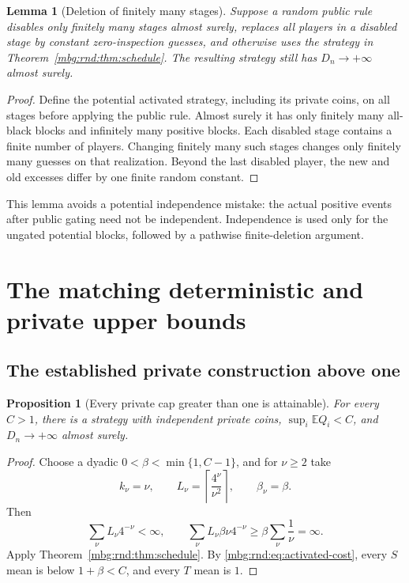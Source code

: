 \documentclass[11pt,letterpaper]{article}
\newtheorem{lemma}[theorem]{Lemma}
\newtheorem{proposition}[theorem]{Proposition}
\theoremstyle{definition}
\newcommand{\E}{\mathbb E}
\begin{document}
\begin{lemma}[Deletion of finitely many stages]
\label{mbg:rnd:lem:deletion}
Suppose a random public rule disables only finitely many stages almost
surely, replaces all players in a disabled stage by constant
zero-inspection guesses, and otherwise uses the strategy in
Theorem~\ref{mbg:rnd:thm:schedule}. The resulting strategy still has
$D_n\to+\infty$ almost surely.
\end{lemma}
\begin{proof}
Define the potential activated strategy, including its private coins,
on all stages before applying the public rule. Almost surely it has
only finitely many all-black blocks and infinitely many positive
blocks. Each disabled stage contains a finite number of players.
Changing finitely many such stages changes only finitely many guesses
on that realization. Beyond the last disabled player, the new and old
excesses differ by one finite random constant.
\end{proof}

This lemma avoids a potential independence mistake: the actual positive
events after public gating need not be independent. Independence is
used only for the ungated potential blocks, followed by a pathwise
finite-deletion argument.

\section{The matching deterministic and private upper bounds}
\label{mbg:rnd:sec:known-frontiers}

\subsection{The established private construction above one}

\begin{proposition}[Every private cap greater than one is attainable]
\label{mbg:rnd:prop:private-upper}
For every $C>1$, there is a strategy with independent private coins,
$\sup_i\E Q_i<C$, and $D_n\to+\infty$ almost surely.
\end{proposition}
\begin{proof}
Choose a dyadic $0<\beta<\min\{1,C-1\}$, and for $\nu\ge2$ take
\begin{equation}
 k_\nu=\nu,\qquad L_\nu=\left\lceil\frac{4^\nu}{\nu^2}\right\rceil,
 \qquad\beta_\nu=\beta.
 \label{mbg:rnd:eq:private-schedule}
\end{equation}
Then
\[
 \sum_\nu L_\nu4^{-\nu}<\infty,
 \qquad
 \sum_\nu L_\nu\beta \nu4^{-\nu}\ge\beta\sum_\nu\frac1\nu=\infty.
\]
Apply Theorem~\ref{mbg:rnd:thm:schedule}. By \eqref{mbg:rnd:eq:activated-cost}, every $S$
mean is below $1+\beta<C$, and every $T$ mean is $1$.
\end{proof}
\end{document}
